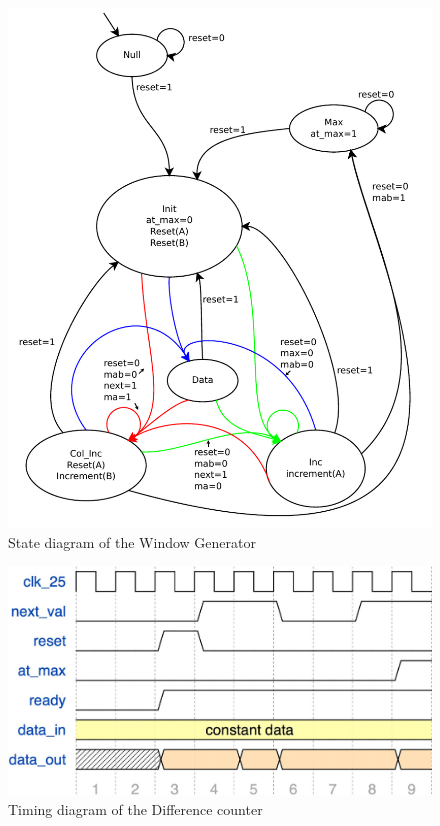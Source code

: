 \documentclass{article}
\begin{document}
\begin{figure}[h!]
  \centering
    \includegraphics[width=\textwidth]{state_diagrams/diff_window_gen.pdf}
  \caption{State diagram of the Window Generator}
\end{figure}

\begin{figure}[h!]
  \centering
    \includegraphics[width=\textwidth]{timing_diagrams/diff_counter.pdf}
  \caption{Timing diagram of the Difference counter}
\end{figure}
\end{document}
